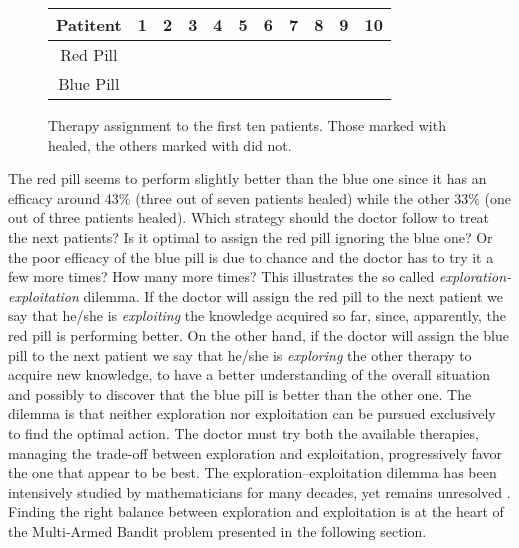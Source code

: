 \begin{figure}[H]
	\centering
	\begin{tabular}{|c|l|lcccccccccc|}
		\hline
		\multicolumn{3}{|c}{\textbf{Patitent}} & 1      & 2      & 3      & 4      & 5      & 6      & 7      & 8      & 9      & 10     \\ \hline
		\multicolumn{3}{|c}{Red Pill}          & \xmark &        &        & \xmark &        & \cmark & \cmark & \cmark & \xmark & \xmark \\
		\multicolumn{3}{|c}{Blue Pill}         &        & \cmark & \xmark &        & \xmark &        &        &        &        &        \\ \hline
	\end{tabular}
	
	\caption{Therapy assignment to the first ten patients. Those marked with \cmark healed, the others marked with \xmark  did not. }
	\label{f:clinical}
\end{figure}
The red pill seems to perform slightly better than the blue one since it has an efficacy around 43\% (three out of seven patients healed) while the other 33\% (one out of three patients healed). Which strategy should the doctor follow to treat the next patients? Is it optimal to assign the red pill ignoring the blue one? Or the poor efficacy of the blue pill is due to chance and the doctor has to try it a few more times? How many more times? This illustrates the so called 	\emph{exploration-exploitation} dilemma. If the doctor will assign the red pill to the next patient we say that he/she is \emph{exploiting} the knowledge acquired so far, since, apparently, the red pill is performing better. On the other hand, if the doctor will assign the blue pill to the next patient we say that he/she is \emph{exploring} the other therapy to acquire new knowledge, to have a better understanding of the overall situation and possibly to discover that the blue pill is better than the other one. The dilemma is that neither exploration nor exploitation can be pursued exclusively to find the optimal action. The doctor must try both the available therapies, managing the trade-off between exploration and exploitation, progressively favor the one that appear to be best. The exploration–exploitation dilemma has been intensively studied by mathematicians for many decades, yet remains unresolved \citep{sutton2018reinforcement}. Finding the right balance between exploration and exploitation is at the heart of the Multi-Armed Bandit problem presented in the following section.
